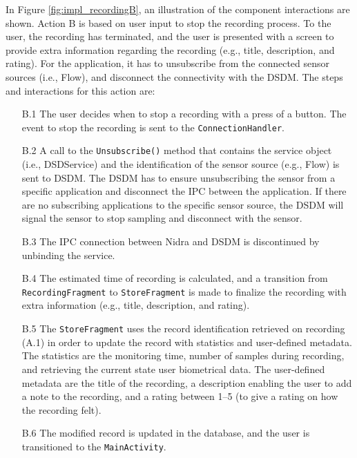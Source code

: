 In Figure \ref{fig:impl_recordingB}, an illustration of the component interactions are shown. Action B is based on user input to stop the recording process. To the user, the recording has terminated, and the user is presented with a screen to provide extra information regarding the recording (e.g., title, description, and rating). For the application, it has to unsubscribe from the connected sensor sources (i.e., Flow), and disconnect the connectivity with the DSDM. The steps and interactions for this action are:

\begin{itemize}
    \item[B.1] The user decides when to stop a recording with a press of a button. The event to stop the recording is sent to the \verb|ConnectionHandler|.
    \item[B.2] A call to the \verb|Unsubscribe()| method that contains the service object (i.e., DSDService) and the identification of the sensor source (e.g., Flow) is sent to DSDM. The DSDM has to ensure unsubscribing the sensor from a specific application and disconnect the IPC between the application. If there are no subscribing applications to the specific sensor source, the DSDM will signal the sensor to stop sampling and disconnect with the sensor. 
    \item[B.3] The IPC connection between Nidra and DSDM is discontinued by unbinding the service. 
    \item[B.4] The estimated time of recording is calculated, and a transition from \verb|RecordingFragment| to \verb|StoreFragment| is made to finalize the recording with extra information (e.g., title, description, and rating). 
    \item[B.5] The \verb|StoreFragment| uses the record identification retrieved on recording (A.1) in order to update the record with statistics and user-defined metadata. The statistics are the monitoring time, number of samples during recording, and retrieving the current state user biometrical data. The user-defined metadata are the title of the recording, a description enabling the user to add a note to the recording, and a rating between 1--5 (to give a rating on how the recording felt). 
    \item[B.6] The modified record is updated in the database, and the user is transitioned to the \verb|MainActivity|.
\end{itemize}

